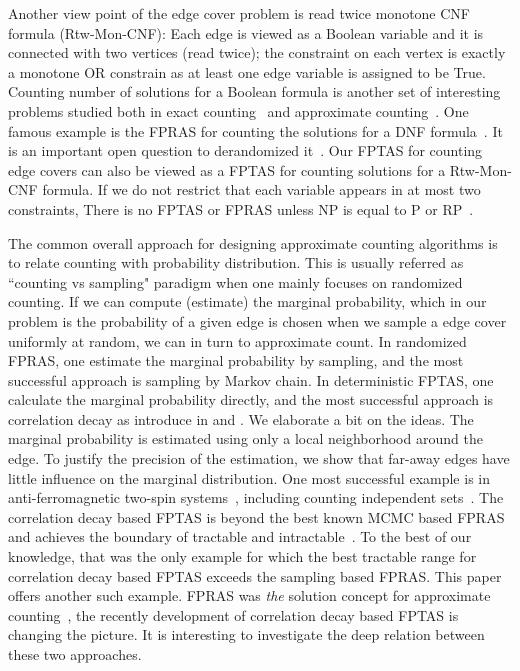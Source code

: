 Another view point of the edge cover problem is read twice monotone CNF formula (Rtw-Mon-CNF): Each edge is viewed as a Boolean variable and it is connected with two vertices (read twice); the constraint on each vertex is exactly a monotone OR constrain as at least one edge variable is assigned to be True. Counting number of solutions for a Boolean formula is another set of interesting problems studied both in exact counting~\cite{} and approximate counting~\cite{}. One famous example is the FPRAS for counting the solutions for a  DNF formula~\cite{}. It is an important open question to derandomized it~\cite{}. Our FPTAS for counting edge covers can also be viewed as a FPTAS for counting solutions for a  Rtw-Mon-CNF formula. If we do not restrict that each variable appears in at most two constraints, There is no FPTAS or FPRAS unless NP is equal to P or RP~\cite{}.

The common overall approach for designing approximate counting algorithms is to relate counting with probability distribution. 
 This is usually referred as ``counting vs sampling" paradigm when one mainly focuses on randomized counting.  If we can compute (estimate) the marginal probability, which in our problem is the probability of a given edge is chosen when we sample a edge cover uniformly at random, we can in turn to approximate count. In randomized FPRAS, one estimate the marginal probability by sampling, and the most successful approach is sampling by Markov chain.
In deterministic FPTAS, one calculate the marginal probability directly, and the most successful approach is correlation decay as introduce in \cite{BG08} and \cite{Weitz06}. We elaborate a bit on the ideas.
 The marginal probability is estimated using only a local neighborhood around the edge. To justify the precision of the estimation, we show that far-away edges have little influence on the marginal distribution.
One most successful example is in anti-ferromagnetic two-spin systems~\cite{}, including counting independent sets~\cite{Weitz06}. The correlation decay based FPTAS is beyond the best known MCMC based FPRAS and achieves the boundary of tractable and intractable~\cite{}.
To the best of our knowledge, that was the only example for which the best tractable range for correlation decay based FPTAS exceeds the sampling based FPRAS. This paper offers another such example. FPRAS was \emph{the} solution concept for approximate counting~\cite{}, the recently development of correlation decay based FPTAS is changing the picture. It is interesting to investigate the deep relation between these two approaches.

